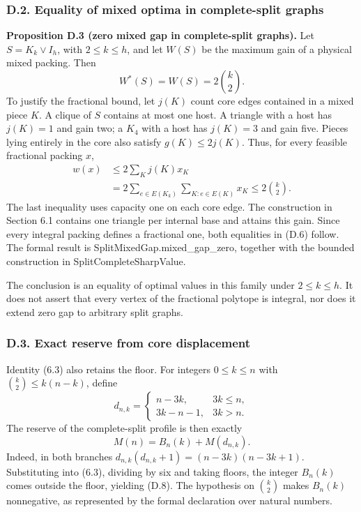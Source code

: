 \documentclass[english,11pt,a4paper]{article}
\begin{document}

\subsubsection{D.2. Equality of mixed optima in complete-split graphs}\label{d.2.-equality-of-mixed-optima-in-complete-split-graphs}

\textbf{Proposition D.3 (zero mixed gap in complete-split graphs).} Let \(S=K_k\vee I_h\), with \(2\le k\le h\), and let \(W(S)\) be the maximum gain of a physical mixed packing. Then \[
W^*(S)=W(S)=2\binom k2.
\tag{D.6}
\] To justify the fractional bound, let \(j(K)\) count core edges contained in a mixed piece \(K\). A clique of \(S\) contains at most one host. A triangle with a host has \(j(K)=1\) and gain two; a \(K_4\) with a host has \(j(K)=3\) and gain five. Pieces lying entirely in the core also satisfy \(g(K)\le2j(K)\). Thus, for every feasible fractional packing \(x\), \[
\begin{aligned}
w(x)&\le2\sum_K j(K)x_K\\
&=2\sum_{e\in E(K_k)}\sum_{K:e\in E(K)}x_K
\le2\binom k2.
\end{aligned}
\tag{D.7}
\] The last inequality uses capacity one on each core edge. The construction in Section 6.1 contains one triangle per internal base and attains this gain. Since every integral packing defines a fractional one, both equalities in (D.6) follow. The formal result is {\ttfamily\small SplitMixedGa\discretionary{\hbox{\ensuremath{\hookrightarrow}}}{}{}p.\discretionary{\hbox{\ensuremath{\hookrightarrow}}}{}{}mixed\_\discretionary{\hbox{\ensuremath{\hookrightarrow}}}{}{}gap\_\discretionary{\hbox{\ensuremath{\hookrightarrow}}}{}{}zero}, together with the bounded construction in {\ttfamily\small SplitComplet\discretionary{\hbox{\ensuremath{\hookrightarrow}}}{}{}eSharpValue}.

The conclusion is an equality of optimal values in this family under \(2\le k\le h\). It does not assert that every vertex of the fractional polytope is integral, nor does it extend zero gap to arbitrary split graphs.

\subsubsection{D.3. Exact reserve from core displacement}\label{d.3.-exact-reserve-from-core-displacement}

Identity (6.3) also retains the floor. For integers \(0\le k\le n\) with \(\binom k2\le k(n-k)\), define \[
d_{n,k}=\begin{cases}n-3k,&3k\le n,\\3k-n-1,&3k>n.\end{cases}
\] The reserve of the complete-split profile is then exactly \[
M(n)=B_n(k)+M(d_{n,k}).
\tag{D.8}
\] Indeed, in both branches \(d_{n,k}(d_{n,k}+1)=(n-3k)(n-3k+1)\). Substituting into (6.3), dividing by six and taking floors, the integer \(B_n(k)\) comes outside the floor, yielding (D.8). The hypothesis on \(\binom k2\) makes \(B_n(k)\) nonnegative, as represented by the formal declaration over natural numbers.
\end{document}

